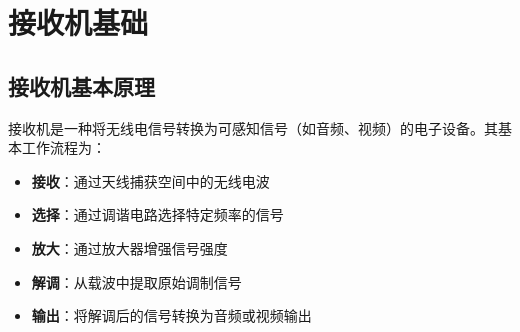 
\chapter{接收机基础}
\label{chap:receiver_fundamentals}

\section{接收机基本原理}
\label{sec:receiver_principle}

接收机是一种将无线电信号转换为可感知信号（如音频、视频）的电子设备。其基本工作流程为：

\begin{itemize}
    \item \textbf{接收}：通过天线捕获空间中的无线电波
    \item \textbf{选择}：通过调谐电路选择特定频率的信号
    \item \textbf{放大}：通过放大器增强信号强度
    \item \textbf{解调}：从载波中提取原始调制信号
    \item \textbf{输出}：将解调后的信号转换为音频或视频输出
\end{itemize}


